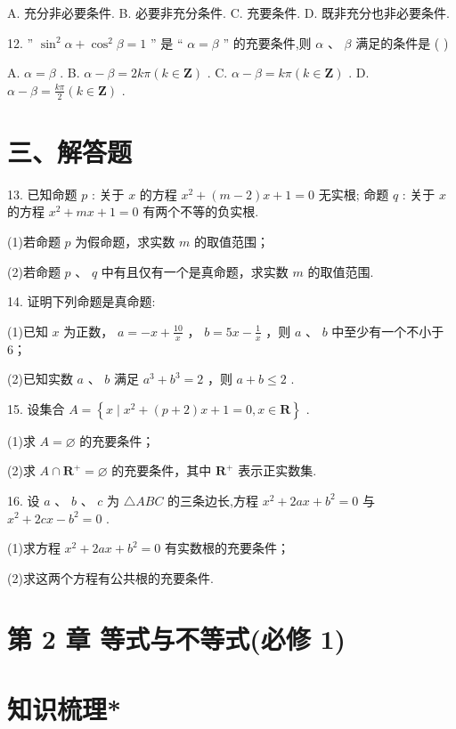 A. 充分非必要条件. B. 必要非充分条件. C. 充要条件. D. 既非充分也非必要条件.

12. ” ${\sin }^{2}\alpha  + {\cos }^{2}\beta  = 1$ ” 是 “ $\alpha  = \beta$ ” 的充要条件,则 $\alpha$ 、 $\beta$ 满足的条件是 ( )

A. $\alpha  = \beta$ . B. $\alpha  - \beta  = {2k\pi }\left( {k \in  \mathbf{Z}}\right)$ . C. $\alpha  - \beta  = {k\pi }\left( {k \in  \mathbf{Z}}\right)$ . D. $\alpha  - \beta  = \frac{k\pi }{2}\left( {k \in  \mathbf{Z}}\right)$ .

\section*{三、解答题}

13. 已知命题 $p$ : 关于 $x$ 的方程 ${x}^{2} + \left( {m - 2}\right) x + 1 = 0$ 无实根; 命题 $q$ : 关于 $x$ 的方程 ${x}^{2} + {mx} + 1 = 0$ 有两个不等的负实根.

(1)若命题 $p$ 为假命题，求实数 $m$ 的取值范围；

(2)若命题 $p$ 、 $q$ 中有且仅有一个是真命题，求实数 $m$ 的取值范围.

14. 证明下列命题是真命题:

(1)已知 $x$ 为正数， $a =  - x + \frac{10}{x}$ ， $b = {5x} - \frac{1}{x}$ ，则 $a$ 、 $b$ 中至少有一个不小于 6；

(2)已知实数 $a$ 、 $b$ 满足 ${a}^{3} + {b}^{3} = 2$ ，则 $a + b \leq  2$ .

15. 设集合 $A = \left\{  {x \mid  {x}^{2} + \left( {p + 2}\right) x + 1 = 0,x \in  \mathbf{R}}\right\}$ .

(1)求 $A = \varnothing$ 的充要条件；

(2)求 $A \cap  {\mathbf{R}}^{ + } = \varnothing$ 的充要条件，其中 ${\mathbf{R}}^{ + }$ 表示正实数集.

16. 设 $a$ 、 $b$ 、 $c$ 为 $\bigtriangleup {ABC}$ 的三条边长,方程 ${x}^{2} + {2ax} + {b}^{2} = 0$ 与 ${x}^{2} + {2cx} - {b}^{2} = 0$ .

(1)求方程 ${x}^{2} + {2ax} + {b}^{2} = 0$ 有实数根的充要条件；

(2)求这两个方程有公共根的充要条件.

\section*{第 2 章 等式与不等式(必修 1)}

\section*{知识梳理*}

